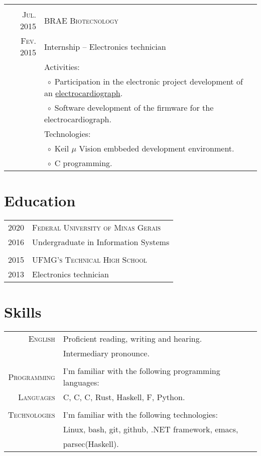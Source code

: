 \documentclass[a4paper,10pt]{article}
\newcommand{\tabitem}{$\;\circ\;$}
\newcommand{\cpp}{C\protect\scalebox{0.8}{\protect\raisebox{0.4ex}{++}}}
\renewcommand\#{\protect\scalebox{0.8}{\protect\raisebox{0.4ex}{\char"0023}}}
\begin{document}
\begin{tabular}{r|p{12.3cm}}
  \multicolumn{2}{c}{} \\
  \textsc{Jul. 2015} & \textsc{BRAE Biotecnology} \\
  \textsc{Fev. 2015} & Internship -- Electronics technician \\[5pt]
  & Activities: \\
  & \tabitem Participation in the electronic project development of an \href{http://www.ferox.vet.br/pt-br/produtos/ecg-veterinario.aspx}{electrocardiograph}. \\
  & \tabitem Software development of the firmware for the electrocardiograph. \\
  & Technologies: \\
  & \tabitem Keil $\mu$ \kern-5pt Vision embbeded development environment. \\
  & \tabitem C programming.
\end{tabular}


\section{Education}
\begin{tabular}{r|l}
  \textsc{2020} & \textsc{Federal University of Minas Gerais} \\
  \textsc{2016} & Undergraduate in Information Systems \\
  
  \multicolumn{2}{c}{} \\
  \textsc{2015} & \textsc{UFMG's Technical High School} \\
  \textsc{2013} & Electronics technician \\
\end{tabular}


\section{Skills}
\begin{tabular}{r|l}
  \textsc{English} & Proficient reading, writing and hearing. \\
  & Intermediary pronounce. \\
  
  \multicolumn{2}{c}{} \\
  \textsc{Programming} & I'm familiar with the following programming languages: \\
  \textsc{Languages} & C, \cpp, C\#, Rust, Haskell, F\#, Python. \\
  
  \multicolumn{2}{c}{} \\
  \textsc{Technologies} & I'm familiar with the following technologies: \\
  & Linux, bash, git, github, .NET framework, emacs, \\
  & parsec(Haskell).
\end{tabular}
\end{document}
